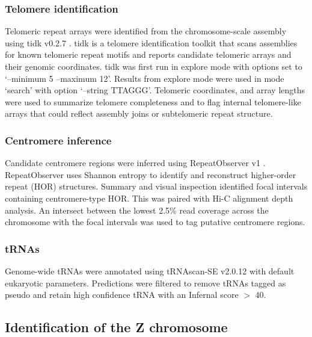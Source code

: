 \documentclass[11pt]{article}
\begin{document}
\subsubsection{Telomere identification}

Telomeric repeat arrays were identified from the chromosome-scale assembly using tidk v0.2.7 \cite{Brown2025tidk}. tidk is a telomere identification toolkit that scans assemblies for known telomeric repeat motifs and reports candidate telomeric arrays and their genomic coordinates. tidk was first run in explore mode with options set to ‘--minimum 5 --maximum 12’. Results from explore mode were used in mode ‘search’ with option ‘--string TTAGGG’.  Telomeric coordinates, and array lengths were used to summarize telomere completeness and to flag internal telomere-like arrays that could reflect assembly joins or subtelomeric repeat structure.

\subsubsection{Centromere inference}

Candidate centromere regions were inferred using RepeatObserver v1 \cite{Schultz2025RepeatOBserver}. RepeatObserver uses Shannon entropy to identify and reconstruct higher-order repeat (HOR) structures. Summary and visual inspection identified focal intervals containing centromere-type HOR. This was paired with Hi-C alignment depth analysis. An intersect between the lowest 2.5\% read coverage across the chromosome with the focal intervals was used to tag putative centromere regions. 

\subsubsection{tRNAs}

Genome-wide tRNAs were annotated using tRNAscan-SE v2.0.12 \cite{Chan2021tRNAscanSE} with default eukaryotic parameters. Predictions were filtered to remove tRNAs tagged as pseudo and retain high confidence tRNA with an Infernal score $>$ 40.

\subsection{Identification of the Z chromosome}
\end{document}
